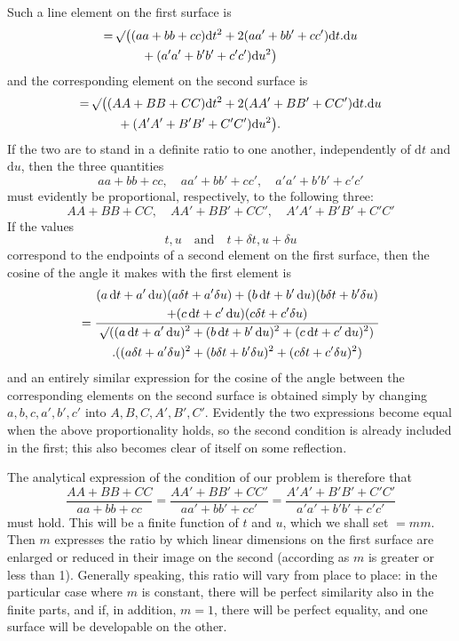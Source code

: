 Such a line element on the first surface is
\[
\begin{aligned}
={}&\mathord{{}^{}\!\surd}\bigl((aa+bb+cc)\mathrm{d}t^2+2(aa'+bb'+cc')\mathrm{d}t\mathord{.}\mathrm{d}u\\
&\qquad+(a'a'+b'b'+c'c')\mathrm{d}u^2\bigr)
\end{aligned}
\]
\noindent and the corresponding element on the second surface is
\[
\begin{aligned}
={}&\mathord{{}^{}\!\surd}\bigl((AA+BB+CC)\mathrm{d}t^2+2(AA'+BB'+CC')\mathrm{d}t\mathord{.}\mathrm{d}u\\
&\qquad+(A'A'+B'B'+C'C')\mathrm{d}u^2\bigr).
\end{aligned}
\]
\noindent If the two are to stand in a definite ratio to one another, independently of \(\mathrm{d}t\) and \(\mathrm{d}u\), then the three quantities
\[
aa+bb+cc,\quad aa'+bb'+cc',\quad a'a'+b'b'+c'c'
\]
\noindent must evidently be proportional, respectively, to the following three:
\[
AA+BB+CC,\quad AA'+BB'+CC',\quad A'A'+B'B'+C'C'
\]
\noindent If the values
\[
t,u\quad\text{and}\quad t+\delta t,u+\delta u
\]
\noindent correspond to the endpoints of a second element on the first surface, then the cosine of the angle it makes with the first element is
\[
=\frac{\begin{gathered}(a\,\mathrm{d}t+a'\,\mathrm{d}u)(a\delta t+a'\delta u)+(b\,\mathrm{d}t+b'\,\mathrm{d}u)(b\delta t+b'\delta u)\\+(c\,\mathrm{d}t+c'\,\mathrm{d}u)(c\delta t+c'\delta u)\end{gathered}}{\begin{gathered}\mathord{{}^{}\!\surd}((a\,\mathrm{d}t+a'\,\mathrm{d}u)^2+(b\,\mathrm{d}t+b'\,\mathrm{d}u)^2+(c\,\mathrm{d}t+c'\,\mathrm{d}u)^2)\\\mathord{.}((a\delta t+a'\delta u)^2+(b\delta t+b'\delta u)^2+(c\delta t+c'\delta u)^2)\end{gathered}}
\]
\noindent and an entirely similar expression for the cosine of the angle between the corresponding elements on the second surface is obtained simply by changing \(a,b,c,a',b',c'\) into \(A,B,C,A',B',C'\). Evidently the two expressions become equal when the above proportionality holds, so the second condition is already included in the first; this also becomes clear of itself on some reflection.

The analytical expression of the condition of our problem is therefore that
\[
\frac{AA+BB+CC}{aa+bb+cc}=\frac{AA'+BB'+CC'}{aa'+bb'+cc'}=\frac{A'A'+B'B'+C'C'}{a'a'+b'b'+c'c'}
\]
\noindent must hold. This will be a finite function of \(t\) and \(u\), which we shall set \(=mm\). Then \(m\) expresses the ratio by which linear dimensions on the first surface are enlarged or reduced in their image on the second (according as \(m\) is greater or less than 1). Generally speaking, this ratio will vary from place to place: in the particular case where \(m\) is constant, there will be perfect similarity also in the finite parts, and if, in addition, \(m=1\), there will be perfect equality, and one surface will be developable on the other.

